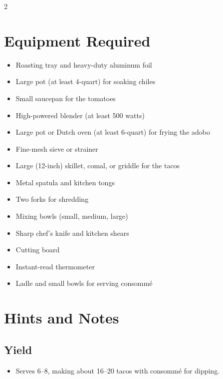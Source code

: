 \documentclass[11pt,letterpaper]{article}
\begin{document}
{\small
\setlength{\columnsep}{20pt}
\setlength{\multicolsep}{6pt}
\begin{multicols}{2}
\setlength{\parindent}{0pt}
\setlength{\parskip}{4pt}

\section*{Equipment Required}
\begin{itemize}
    \item Roasting tray and heavy-duty aluminum foil
    \item Large pot (at least 4-quart) for soaking chiles
    \item Small saucepan for the tomatoes
    \item High-powered blender (at least 500 watts)
    \item Large pot or Dutch oven (at least 6-quart) for frying the adobo
    \item Fine-mesh sieve or strainer
    \item Large (12-inch) skillet, comal, or griddle for the tacos
    \item Metal spatula and kitchen tongs
    \item Two forks for shredding
    \item Mixing bowls (small, medium, large)
    \item Sharp chef's knife and kitchen shears
    \item Cutting board
    \item Instant-read thermometer
    \item Ladle and small bowls for serving consommé
\end{itemize}

\section*{Hints and Notes}

\subsection*{Yield}
\begin{itemize}
    \item Serves 6--8, making about 16--20 tacos with consommé for dipping.
\end{itemize}


\end{multicols}}
\end{document}
